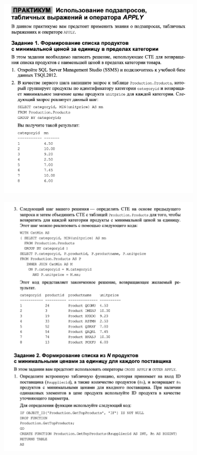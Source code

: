 \begin{figure}[h!]
	\begin{center}
		\includegraphics[width=0.9\textwidth]{img/ex7.png}
	\end{center}
	\captionsetup{justification=centering}
\end{figure}


\begin{figure}[h!]
	\begin{center}
		\includegraphics[width=0.9\textwidth]{img/ex8.png}
	\end{center}
	\captionsetup{justification=centering}
\end{figure}
\clearpage


